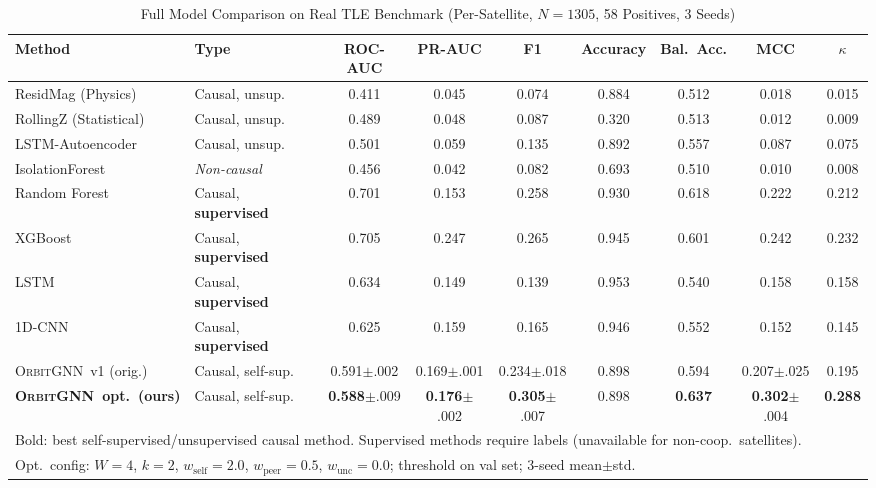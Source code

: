 \documentclass[journal]{IEEEtran}
\newcommand{\orbitgnn}{\textsc{OrbitGNN}}
\begin{document}
\begin{table}[t]
\centering
\caption{Full Model Comparison on Real TLE Benchmark (Per-Satellite, $N=1305$, 58 Positives, 3 Seeds)}
\label{tab:main}
\setlength\tabcolsep{5pt}
\begin{tabular}{@{}llccccccc@{}}
\toprule
Method & Type & ROC-AUC & PR-AUC & F1 & Accuracy & Bal.\ Acc. & MCC & $\kappa$ \\
\midrule
ResidMag (Physics)           & Causal, unsup.     & 0.411 & 0.045 & 0.074 & 0.884 & 0.512 & 0.018 & 0.015 \\
RollingZ (Statistical)       & Causal, unsup.     & 0.489 & 0.048 & 0.087 & 0.320 & 0.513 & 0.012 & 0.009 \\
LSTM-Autoencoder             & Causal, unsup.     & 0.501 & 0.059 & 0.135 & 0.892 & 0.557 & 0.087 & 0.075 \\
IsolationForest              & \emph{Non-causal}  & 0.456 & 0.042 & 0.082 & 0.693 & 0.510 & 0.010 & 0.008 \\
\midrule
Random Forest                & Causal, \textbf{supervised} & 0.701 & 0.153 & 0.258 & 0.930 & 0.618 & 0.222 & 0.212 \\
XGBoost                      & Causal, \textbf{supervised} & 0.705 & 0.247 & 0.265 & 0.945 & 0.601 & 0.242 & 0.232 \\
LSTM                         & Causal, \textbf{supervised} & 0.634 & 0.149 & 0.139 & 0.953 & 0.540 & 0.158 & 0.158 \\
1D-CNN                       & Causal, \textbf{supervised} & 0.625 & 0.159 & 0.165 & 0.946 & 0.552 & 0.152 & 0.145 \\
\midrule
\orbitgnn\ v1 (orig.)       & Causal, self-sup. & 0.591\tiny{$\pm$.002} & 0.169\tiny{$\pm$.001} & 0.234\tiny{$\pm$.018} & 0.898 & 0.594 & 0.207\tiny{$\pm$.025} & 0.195 \\
\textbf{\orbitgnn\ opt.\ (ours)} & Causal, self-sup. & \textbf{0.588}\tiny{$\pm$.009} & \textbf{0.176}\tiny{$\pm$.002} & \textbf{0.305}\tiny{$\pm$.007} & 0.898 & \textbf{0.637} & \textbf{0.302}\tiny{$\pm$.004} & \textbf{0.288}\\
\bottomrule
\multicolumn{9}{l}{\footnotesize Bold: best self-supervised/unsupervised causal method. Supervised methods require labels (unavailable for non-coop.\ satellites).}\\
\multicolumn{9}{l}{\footnotesize Opt.\ config: $W{=}4$, $k{=}2$, $w_\text{self}{=}2.0$, $w_\text{peer}{=}0.5$, $w_\text{unc}{=}0.0$; threshold on val set; 3-seed mean$\pm$std.}
\end{tabular}
\end{table}
\end{document}
